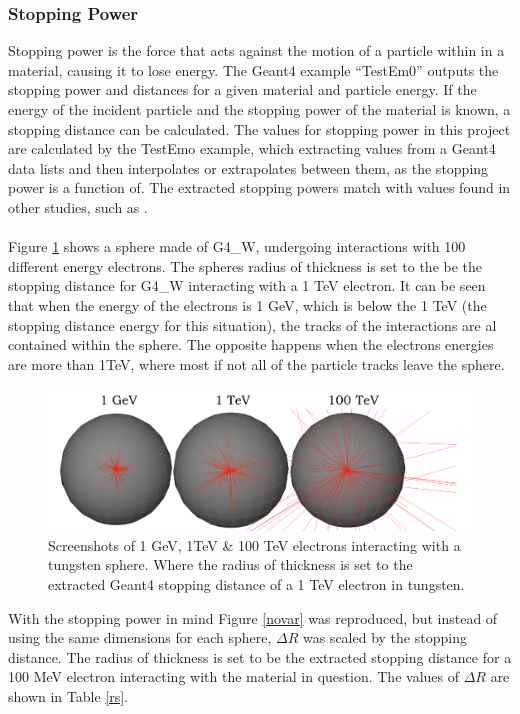 \documentclass[12pt,a4paper]{article}
\begin{document}
\subsubsection{Stopping Power}
\label{stop}
Stopping power is the force that acts against the motion of a particle within in a material, causing it to lose energy. The Geant4 example ``TestEm0'' outputs the stopping power and distances for a given material and particle energy. If the energy of the incident particle and the stopping power of the material is known, a stopping distance can be calculated. The values for stopping power in this project are calculated by the TestEmo example, which extracting values from a Geant4 data lists and then interpolates or extrapolates between them, as the stopping power is a function of. The extracted stopping powers match with values found in other studies, such as \cite{stpdat}.
\\\\
Figure \ref{tung} shows a sphere made of G4\_W, undergoing interactions with 100 different energy electrons. The spheres radius of thickness is set to the be the stopping distance for G4\_W interacting with a 1 TeV electron. It can be seen that when the energy of the electrons is 1 GeV, which is below the 1 TeV (the stopping distance energy for this situation), the tracks of the interactions are al contained within the sphere. The opposite happens when the electrons energies are more than 1TeV, where most if not all of the particle tracks leave the sphere. 

\begin{figure}[h!]
\hspace*{1.4cm}\includegraphics[scale=0.5]{Images//BDSIM//Tungsten_Sphere.png}
\caption[width=\columnwidth]{Screenshots of 1 GeV, 1TeV \& 100 TeV electrons interacting with a tungsten sphere. Where the radius of thickness is set to the extracted Geant4 stopping distance of a 1 TeV electron in tungsten.}
\label{tung}
\end{figure}

\noindent With the stopping power in mind Figure \ref{novar} was reproduced, but instead of using the same dimensions for each sphere, $\Delta R$ was scaled by the stopping distance. The radius of thickness is set to be the extracted stopping distance for a 100 MeV electron interacting with the material in question. The values of $\Delta R$ are shown in Table \ref{rs}.
\end{document}
